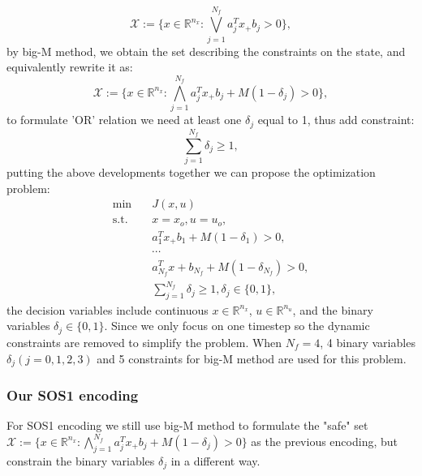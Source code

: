 \documentclass[a4paper]{report}
\begin{document}
\begin{equation}
    \mathcal{X}:= \{x \in \mathbb{R}^{n_x}:\bigvee_{j=1}^{N_f} a_j^Tx_ +b_j>0 \},
\end{equation}
by big-M method, we obtain the set describing the constraints on the state, and equivalently rewrite it as:
\begin{equation}
    \mathcal{X}:= \{x \in \mathbb{R}^{n_x}:\bigwedge_{j=1}^{N_f} a_j^Tx_ +b_j +M(1-\delta_j)>0 \},
\end{equation}
to formulate 'OR' relation we need at least one $\delta_j$ equal to 1, thus add constraint:
\begin{equation}
    \sum_{j=1}^{N_f} \delta_{j} \geq 1,
\end{equation}
putting the above developments together we can propose the optimization problem:
\begin{equation}
    \begin{aligned}
        \min \quad       &  J(x,u)\\
        \text{s.t.}\quad &
        x =x_o, u= u_o,                        
         \\
                         & a_1^Tx_ +b_1 +M(1-\delta_1)>0,                                   \\
                         & \cdots \\
                         & a_{N_f}^Tx + b_{N_f} +M(1-\delta_{N_f})>0,                                   \\
                         &    \sum_{j=1}^{N_f} \delta_{j} \geq 1, \delta_{j} \in \{0,1\},
    \end{aligned}
    \label{simple_ex1}
\end{equation}
the decision variables include continuous $x \in \mathbb{R}^{n_x}$, $u \in \mathbb{R}^{n_u}$, and the binary variables $\delta_j \in \{0,1\}$. Since we only focus on one timestep so the dynamic constraints are removed to simplify the problem. When $N_f=4$, 4 binary variables $\delta_j (j=0,1,2,3)$ and 5 constraints for big-M method are used for this problem.

\subsubsection{Our SOS1 encoding}

For SOS1 encoding we still use big-M method to formulate the "safe" set $\mathcal{X}:= \{x \in \mathbb{R}^{n_x}:\bigwedge_{j=1}^{N_f} a_j^Tx_ +b_j +M(1-\delta_j)>0 \}$ as the previous encoding, but constrain the binary variables $\delta_j$ in a different way.
\end{document}
